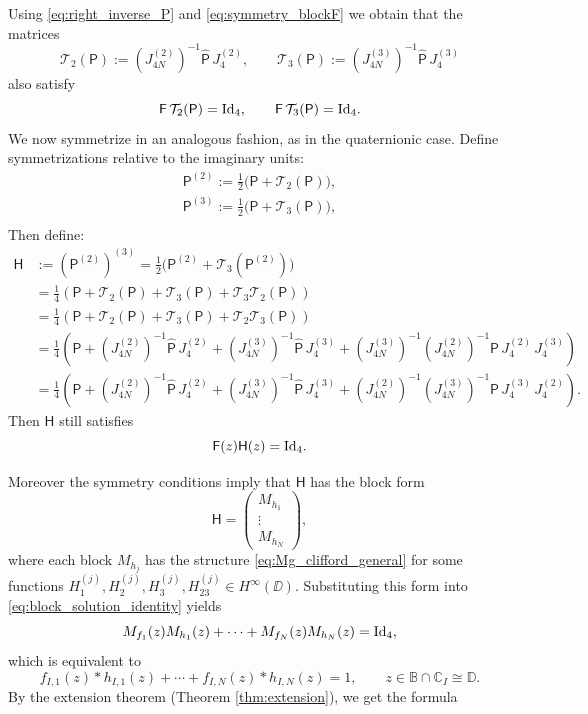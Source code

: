 \documentclass[11pt]{amsart}
\begin{document}
Using \eqref{eq:right_inverse_P} and \eqref{eq:symmetry_blockF} we obtain that the matrices
\[
\mathcal T_2(\mathsf{P}):=(J_{4N}^{(2)})^{-1}\widehat{\mathsf{P}}\,J_4^{(2)},
\qquad
\mathcal T_3(\mathsf{P}):=(J_{4N}^{(3)})^{-1}\widehat{\mathsf{P}}\,J_4^{(3)}
\]
also satisfy
\[
\mathsf{F}\,\mathcal T_2(\mathsf{P})=\textnormal{Id}_4,
\qquad
\mathsf{F}\,\mathcal T_3(\mathsf{P})=\textnormal{Id}_4 .
\]
We now symmetrize in an analogous fashion, as in the quaternionic case.  Define symmetrizations relative to the imaginary units:
\begin{align*}
\mathsf{P}^{(2)}:=\frac12\bigl(\mathsf{P}+\mathcal T_2(\mathsf{P})\bigr),\\
\mathsf{P}^{(3)}:=\frac12\bigl(\mathsf{P}+\mathcal T_3(\mathsf{P})\bigr),\\
\end{align*}
Then define:
\begin{align*}
\mathsf{H} & :=\left(\mathsf{P}^{(2)}\right)^{(3)} =\frac12\bigl(\mathsf{P}^{(2)}+\mathcal T_3(\mathsf{P}^{(2)})\bigr)\\
& =\frac{1}{4}\left(\mathsf{P}+\mathcal{T}_2(\mathsf{P})+\mathcal{T}_3(\mathsf{P})+
\mathcal{T}_3\mathcal{T}_2(\mathsf{P})\right)\\
& =\frac{1}{4}\left(\mathsf{P}+\mathcal{T}_2(\mathsf{P})+\mathcal{T}_3(\mathsf{P})+\mathcal{T}_2\mathcal{T}_3(\mathsf{P})\right)\\
& =\frac{1}{4}\left(\mathsf{P}+(J_{4N}^{(2)})^{-1}\widehat{\mathsf{P}}\,J_4^{(2)}+(J_{4N}^{(3)})^{-1}\widehat{\mathsf{P}}\,J_4^{(3)}+(J_{4N}^{(3)})^{-1}(J_{4N}^{(2)})^{-1} \mathsf{P}\,J_4^{(2)}\,J_4^{(3)}\right)\\
& =\frac{1}{4}\left(\mathsf{P}+(J_{4N}^{(2)})^{-1}\widehat{\mathsf{P}}\,J_4^{(2)}+(J_{4N}^{(3)})^{-1}
\widehat{\mathsf{P}}\,J_4^{(3)}+(J_{4N}^{(2)})^{-1}(J_{4N}^{(3)})^{-1} \mathsf{P}\,J_4^{(3)}\,J_4^{(2)}\right).
\end{align*}
Then $\mathsf{H}$ still satisfies
\begin{equation}\label{eq:block_solution_identity}
\mathsf{F}(z) \mathsf{H}(z)=\textnormal{Id}_4 .
\end{equation}

Moreover the symmetry conditions imply that $ \mathsf{H}$ has the block form
\[
\mathsf{H}=
\begin{pmatrix}
M_{h_1}\\
\vdots\\
M_{h_N}
\end{pmatrix},
\]
where each block $M_{h_j}$ has the structure \eqref{eq:Mg_clifford_general} for some functions
$H_{1}^{(j)},H_{2}^{(j)},H_{3}^{(j)},H_{23}^{(j)}\in H^\infty(\DD)$.  Substituting this form into \eqref{eq:block_solution_identity} yields
\[
M_{f_1}(z)M_{h_1}(z)+\cdots+M_{f_N}(z)M_{h_N}(z)=\textnormal{Id}_4,
\]
which is equivalent to
\[
f_{I,1}(z)*h_{I,1}(z)+\cdots+f_{I,N}(z)*h_{I,N}(z)=1, \qquad z\in \mathbb{B}\cap\mathbb{C}_I\cong \mathbb{D}.
\]
By the extension theorem (Theorem \ref{thm:extension}), we get the formula
\end{document}
